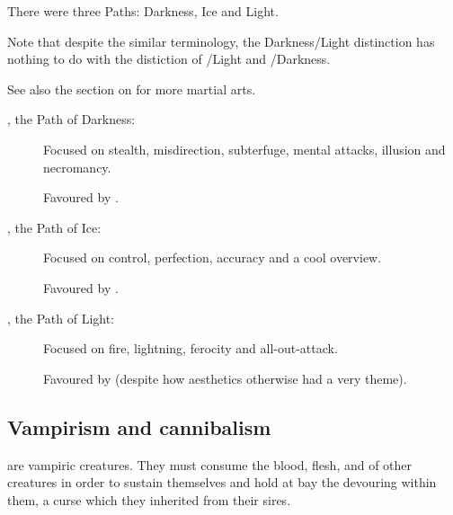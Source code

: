 There were three Paths: Darkness, Ice and Light. 

Note that despite the similar terminology, the Darkness/Light distinction has nothing to do with the distiction of \iquin/Light and \itzach/Darkness. 

See also the section on  for more martial arts. 


\begin{description}
  \item[\Rumicor, the Path of Darkness:]
    Focused on stealth, misdirection, subterfuge, mental attacks, illusion and necromancy. 
    
    Favoured by \TiphredSerah. 
    
    
    
  \item[\Eshethicor, the Path of Ice:]
    Focused on control, perfection, accuracy and a cool overview. 
    
    Favoured by \CiriathSepher. 
    
    
    
  \item[\Shabacora, the Path of Light:]
    Focused on fire, lightning, ferocity and all-out-attack. 
    
    Favoured by \Mystraacht{} (despite how \Mystraacht{} aesthetics otherwise had a very  theme).
\end{description}










\subsection{Vampirism and cannibalism}
\Resphain{} are vampiric creatures. They must consume the blood, flesh,  and  of other creatures in order to sustain themselves and hold at bay the devouring  within them, a curse which they inherited from their \SitraAchra sires.

